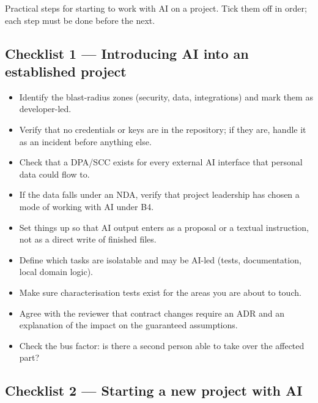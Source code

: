 Practical steps for starting to work with AI on a project.
Tick them off in order; each step must be done before the next.

\subsection{Checklist 1 --- Introducing AI into an established project}

\begin{itemize}[label={}]
\item \cb Identify the blast-radius zones (security, data, integrations) and mark them as developer-led.
\item \cb Verify that no credentials or keys are in the repository; if they are, handle it as an incident before anything else.
\item \cb Check that a DPA/SCC exists for every external AI interface that personal data could flow to.
\item \cb If the data falls under an NDA, verify that project leadership has chosen a mode of working with AI under B4.
\item \cb Set things up so that AI output enters as a proposal or a textual instruction, not as a direct write of finished files.
\item \cb Define which tasks are isolatable and may be AI-led (tests, documentation, local domain logic).
\item \cb Make sure characterisation tests exist for the areas you are about to touch.
\item \cb Agree with the reviewer that contract changes require an ADR and an explanation of the impact on the guaranteed assumptions.
\item \cb Check the bus factor: is there a second person able to take over the affected part?
\end{itemize}

\subsection{Checklist 2 --- Starting a new project with AI}

